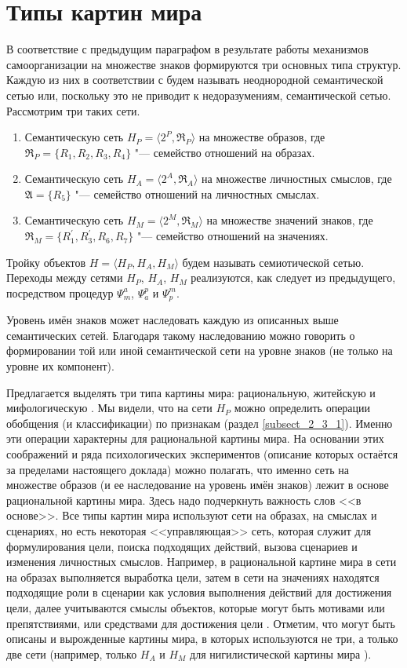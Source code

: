 \chapter{Типы картин мира} \label{AppendixA}

В соответствие с предыдущим параграфом в результате работы механизмов самоорганизации на множестве знаков формируются три основных типа структур. Каждую из них в соответствии с \cite{Osipov1990} будем называть неоднородной семантической сетью или, поскольку это не приводит к недоразумениям, семантической сетью. Рассмотрим три таких сети.
\begin{enumerate}
	\renewcommand\labelenumi{\theenumi.}
	\item Семантическую сеть $H_P=\langle 2^P,\mathfrak R_P\rangle$ на множестве образов, где $\mathfrak R_P=\{R_1,R_2,R_3,R_4\}$ "--- семейство отношений на образах.
	\item Семантическую сеть $H_A=\langle 2^A,\mathfrak R_A\rangle$ на множестве личностных смыслов, где $\mathfrak A=\{R_5\}$ "--- семейство отношений на личностных смыслах.
	\item Семантическую сеть $H_M=\langle 2^M,\mathfrak R_M\rangle$ на множестве значений знаков, где $\mathfrak R_M=\{R_1^\prime,R_3^\prime,R_6,R_7\}$ "--- семейство отношений на значениях.
\end{enumerate}

Тройку объектов $H=\langle H_P,H_A,H_M\rangle$ будем называть семиотической сетью. Переходы между сетями $H_P$, $H_A$, $H_M$ реализуются, как следует из предыдущего, посредством процедур $\Psi_m^a$, $\Psi_a^p$ и $\Psi_p^m$.

Уровень имён знаков может наследовать каждую из описанных выше семантических сетей. Благодаря такому наследованию можно говорить о формировании той или иной семантической сети на уровне знаков (не только на уровне их компонент).

Предлагается выделять три типа картины мира: рациональную, житейскую и мифологическую \cite{Chudova2012a}. 
Мы видели, что на сети $H_P$ можно определить операции обобщения (и классификации) по признакам (раздел \ref{subsect_2_3_1}). Именно эти операции характерны для рациональной картины мира. На основании этих соображений и ряда психологических экспериментов (описание которых остаётся за пределами настоящего доклада) можно полагать, что именно сеть на множестве образов (и ее наследование на уровень имён знаков) лежит в основе рациональной картины мира. Здесь надо подчеркнуть важность слов <<в основе>>. Все типы картин мира используют сети на образах, на смыслах и сценариях, но есть некоторая <<управляющая>> сеть, которая служит для формулирования цели, поиска подходящих действий, вызова сценариев и изменения личностных смыслов. Например, в рациональной картине мира в сети на образах выполняется выработка цели, затем в сети на значениях находятся подходящие роли в сценарии как условия выполнения действий для достижения цели, далее учитываются смыслы объектов, которые могут быть мотивами или препятствиями, или средствами для достижения цели \cite{Chudova2014}. Отметим, что могут быть описаны и вырожденные картины мира, в которых используются не три, а только две сети (например, только $H_A$ и $H_M$ для нигилистической картины мира \cite{Chudova2012a}). 

